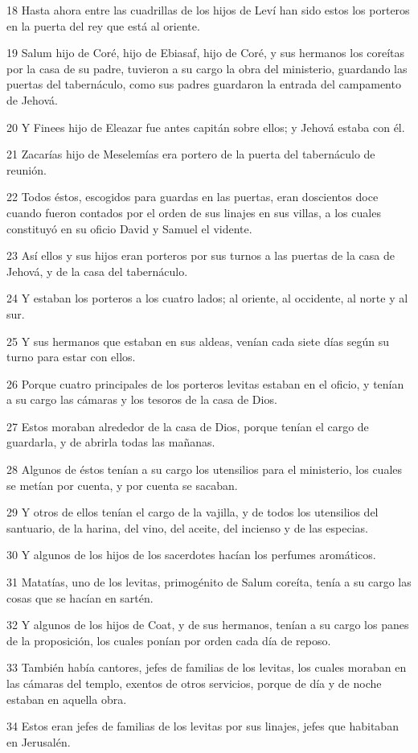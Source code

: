 \par 18 Hasta ahora entre las cuadrillas de los hijos de Leví han sido estos los porteros en la puerta del rey que está al oriente.
\par 19 Salum hijo de Coré, hijo de Ebiasaf, hijo de Coré, y sus hermanos los coreítas por la casa de su padre, tuvieron a su cargo la obra del ministerio, guardando las puertas del tabernáculo, como sus padres guardaron la entrada del campamento de Jehová.
\par 20 Y Finees hijo de Eleazar fue antes capitán sobre ellos; y Jehová estaba con él.
\par 21 Zacarías hijo de Meselemías era portero de la puerta del tabernáculo de reunión.
\par 22 Todos éstos, escogidos para guardas en las puertas, eran doscientos doce cuando fueron contados por el orden de sus linajes en sus villas, a los cuales constituyó en su oficio David y Samuel el vidente.
\par 23 Así ellos y sus hijos eran porteros por sus turnos a las puertas de la casa de Jehová, y de la casa del tabernáculo.
\par 24 Y estaban los porteros a los cuatro lados; al oriente, al occidente, al norte y al sur.
\par 25 Y sus hermanos que estaban en sus aldeas, venían cada siete días según su turno para estar con ellos.
\par 26 Porque cuatro principales de los porteros levitas estaban en el oficio, y tenían a su cargo las cámaras y los tesoros de la casa de Dios.
\par 27 Estos moraban alrededor de la casa de Dios, porque tenían el cargo de guardarla, y de abrirla todas las mañanas.
\par 28 Algunos de éstos tenían a su cargo los utensilios para el ministerio, los cuales se metían por cuenta, y por cuenta se sacaban.
\par 29 Y otros de ellos tenían el cargo de la vajilla, y de todos los utensilios del santuario, de la harina, del vino, del aceite, del incienso y de las especias.
\par 30 Y algunos de los hijos de los sacerdotes hacían los perfumes aromáticos.
\par 31 Matatías, uno de los levitas, primogénito de Salum coreíta, tenía a su cargo las cosas que se hacían en sartén.
\par 32 Y algunos de los hijos de Coat, y de sus hermanos, tenían a su cargo los panes de la proposición, los cuales ponían por orden cada día de reposo.
\par 33 También había cantores, jefes de familias de los levitas, los cuales moraban en las cámaras del templo, exentos de otros servicios, porque de día y de noche estaban en aquella obra.
\par 34 Estos eran jefes de familias de los levitas por sus linajes, jefes que habitaban en Jerusalén.


